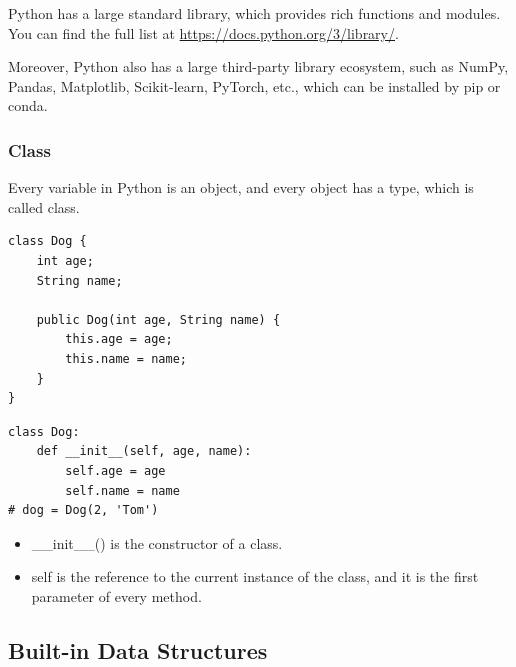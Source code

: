 \documentclass[aspectratio=169, 14pt]{beamer}
\begin{document}
\begin{frame}
	Python has a large standard library, which provides rich functions and modules. You can find the full list at \url{https://docs.python.org/3/library/}.

	Moreover, Python also has a large third-party library ecosystem, such as \alert{NumPy}, \alert{Pandas}, \alert{Matplotlib}, \alert{Scikit-learn}, \alert{PyTorch}, etc., which can be installed by \alert{pip} or \alert{conda}.

\end{frame}

\begin{frame}[fragile]
	\frametitle{Class}
	Every variable in Python is an object, and every object has a type, which is called \alert{class}.
	\begin{verbatim}
class Dog {
    int age;
    String name;

    public Dog(int age, String name) {
        this.age = age;
        this.name = name;
    }
}
  \end{verbatim}
\end{frame}

\begin{frame}[fragile]

	\begin{verbatim}
class Dog:
    def __init__(self, age, name):
        self.age = age
        self.name = name
# dog = Dog(2, 'Tom')
  \end{verbatim}

	\begin{itemize}
		\item \alert{\_\_init\_\_()} is the constructor of a class.
		\item \alert{self} is the reference to the current instance of the class, and it is the first parameter of every method.
	\end{itemize}
\end{frame}

{
\begin{frame}
	\section{\textcolor{darkmidnightblue}{Built-in Data Structures}}
\end{frame}
}
\end{document}
